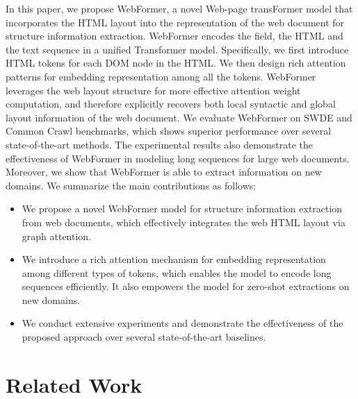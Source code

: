 \documentclass[sigconf]{acmart}
\begin{document}
In this paper, we propose WebFormer, a novel Web-page transFormer model that incorporates the HTML layout into the representation of the web document for structure information extraction. WebFormer encodes the field, the HTML and the text sequence in a unified Transformer model. Specifically, we first introduce HTML tokens for each DOM node in the HTML. We then design rich attention patterns for embedding representation among all the tokens.
WebFormer leverages the web layout structure for more effective attention weight computation, and therefore explicitly recovers both local syntactic and global layout information of the web document.
We evaluate WebFormer on SWDE and Common Crawl benchmarks, which shows superior performance over several state-of-the-art methods. The experimental results also demonstrate the effectiveness of WebFormer in modeling long sequences for large web documents. Moreover, we show that WebFormer is able to extract information on new domains.
We summarize the main contributions as follows:
\begin{itemize}
\item We propose a novel WebFormer model for structure information extraction from web documents, which effectively integrates the web HTML layout via graph attention.
\item We introduce a rich attention mechanism for embedding representation among different types of tokens, which enables the model to encode long sequences efficiently. It also empowers the model for zero-shot extractions on new domains.
\item We conduct extensive experiments and demonstrate the effectiveness of the proposed approach over several state-of-the-art baselines.
\end{itemize}


\section{Related Work}
\end{document}
